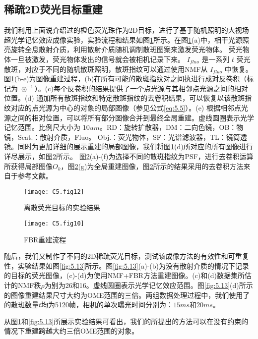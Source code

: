 \subsection{稀疏2D荧光目标重建}
我们利用上面说介绍过的橙色荧光珠作为2D目标，进行了基于随机照明的大视场超光学记忆效应成像实验，实验流程和结果如图\ref{fig:5.12}所示。在图\ref{fig:5.12}(a)中，相干光源照亮旋转全息散射介质，利用散射介质随机调制散斑图案来激发荧光物体。 荧光物体一旦被激发，荧光物体发出的信号就会被相机记录下来。 $I_{fluo}$ 是一系列 $t$ 荧光散斑，对应于不同的随机散斑照明，散斑指纹可以通过使用NMF从 $I_{fluo}$ 中恢复。图\ref{fig:5.12}(b-e)为图像重建过程，(b)在所有可能的散斑指纹对之间执进行成对反卷积（标记为 $\circledast^{-1}$）。(c)每个反卷积的结果提供了一个点光源与其相邻点光源之间的相对位置。(d) 通加所有散斑指纹和特定散斑指纹的去卷积结果，可以恢复以该散斑指纹对应的点光源为中心的对象的局部图像（参见公式\ref{eq:5.5}）。(e) 根据相邻点光源之间的相对位置，可以将所有部分图像合并到最终全局重建。虚线圆圈表示光学记忆范围。比例尺大小为 $10 um$。RD：旋转扩散器，DM：二向色镜，OB：物镜，Scat.：散射介质，Fluo。 Obj.：荧光物体，SF：光谱滤波器，TL：镜筒透镜。同时为更加详细的展示重建的局部图像，我们将图\ref{fig:5.12}(d)所对应的所有图像进行详尽展示，如图\ref{fig:5.10}所示。
图\ref{fig:5.10}(a)-(f)为选择不同的散斑指纹为PSF，进行去卷积运算所获得局部图像$O_{k}$，图\ref{fig:5.10}(g)为全局重建图像，图\ref{fig:5.10}所示的结果采用的去卷积方法来自于参考文献\cite{Chan2011}。

\begin{figure}[htp]
	\centering
	\texttt{[image: C5.fig12]}
	\caption{离散荧光目标的实验结果}
	\label{fig:5.12}
\end{figure}

\begin{figure}[htp]
	\centering
	\texttt{[image: C5.fig10]}
	\caption{FBR重建流程}
	\label{fig:5.10}
\end{figure}

随后，我们又制作了不同的2D稀疏荧光目标，测试该成像方法的有效性和可重复性，实验结果如图\ref{fig:5.13}所示。图\ref{fig:5.13}(a)-(b)为没有散射介质的情况下记录的目标的荧光图像，(c)-(d)为使用NMF+FBR方法重建图像。(c)和(d)数据集所估计的NMF秩$\rho$为别为26和16。虚线圆圈表示光学记忆效应范围。图\ref{fig:5.13}(d)所示的图像重建结果尺寸大约为OME范围的三倍。两组数据处理过程中，我们使用了的散斑数量$t$均为5120帧，相机的单次曝光时间分别为：$15ms$和$20 ms$。

从图\ref{fig:5.12}和\ref{fig:5.13}所展示实验结果可看出，我们的所提出的方法可以在没有约束的情况下重建跨越大约三倍OME范围的对象。

